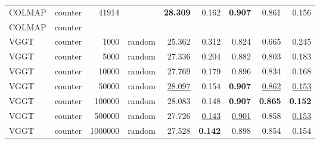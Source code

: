 \begin{table}[H]
\begin{tabular}{llrlrrrrr}
\midrule
COLMAP & counter & 41914 &  & \textbf{28.309} & 0.162 & \textbf{0.907} & 0.861 & 0.156 \\
COLMAP & counter &  &  &  &  &  &  &  \\
VGGT & counter & 1000 & random & 25.362 & 0.312 & 0.824 & 0.665 & 0.245 \\
VGGT & counter & 5000 & random & 27.336 & 0.204 & 0.882 & 0.803 & 0.183 \\
VGGT & counter & 10000 & random & 27.769 & 0.179 & 0.896 & 0.834 & 0.168 \\
VGGT & counter & 50000 & random & \underline{28.097} & 0.154 & \textbf{0.907} & \underline{0.862} & \underline{0.153} \\
VGGT & counter & 100000 & random & 28.083 & 0.148 & \textbf{0.907} & \textbf{0.865} & \textbf{0.152} \\
VGGT & counter & 500000 & random & 27.726 & \underline{0.143} & \underline{0.901} & 0.858 & \underline{0.153} \\
VGGT & counter & 1000000 & random & 27.528 & \textbf{0.142} & 0.898 & 0.854 & 0.154 \\
\bottomrule
\end{tabular}
\end{table}